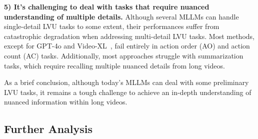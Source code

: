 \textbf{{5) It's challenging to deal with tasks that require nuanced understanding of multiple details.}} Although several MLLMs can handle single-detail LVU tasks to some extent, their performances suffer from catastrophic degradation when addressing multi-detail LVU tasks. Most methods, except for GPT-4o and Video-XL~\cite{shu2024videoxl}, fail entirely in action order (AO) and action count (AC) tasks. Additionally, most approaches struggle with summarization tasks, which require recalling multiple nuanced details from long videos.

As a brief conclusion, although today's MLLMs can deal with some preliminary LVU tasks, it remains a tough challenge to achieve an in-depth understanding of nuanced information within long videos. 

\subsection{Further Analysis}
\label{sec-exp-detail-analysis}

\renewcommand{\arraystretch}{1.2}

\begin{table*}[tp]
    \centering
    \setlength\tabcolsep{2.5pt}
    \vspace{-0.25cm}
    \caption{Detailed discussions about the impact from context length, image understanding (IU) ability, and LLM Backbone. For the IU impact experiment, we used 16-frame uniform sampling for both GPT-4V and GPT-4o. MGV: MiniGPT4-Video, VLM2: Video-LLaMA-2.} 
    \label{tab:ablations}
    \vspace{-0.5cm}
\end{table*}

